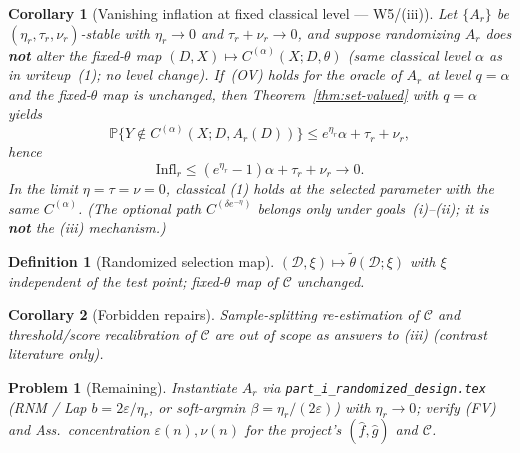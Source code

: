 \documentclass[11pt]{article}
\newtheorem{definition}{Definition}
\newtheorem{corollary}{Corollary}
\newtheorem{problem}{Problem}
\begin{document}
\begin{corollary}[Vanishing inflation at fixed classical level --- W5/(iii)]
\label{cor:vanish}
Let $\{A_r\}$ be $(\eta_r,\tau_r,\nu_r)$-stable with
$\eta_r\to 0$ and $\tau_r+\nu_r\to 0$, and suppose randomizing $A_r$ does
\textbf{not} alter the fixed-$\theta$ map $(D,X)\mapsto C^{(\alpha)}(X;D,\theta)$
(same classical level $\alpha$ as in writeup~(1); \emph{no} level change).
If~(OV) holds for the oracle of $A_r$ at level $q=\alpha$ and the fixed-$\theta$ map
is unchanged, then Theorem~\ref{thm:set-valued} with
$q=\alpha$ yields
\[
\mathbb{P}\bigl\{Y\notin C^{(\alpha)}(X;D,A_r(D))\bigr\}
\le e^{\eta_r}\alpha+\tau_r+\nu_r,
\]
hence
\[
\mathrm{Infl}_r
\le (e^{\eta_r}-1)\alpha+\tau_r+\nu_r
\to 0.
\]
In the limit $\eta=\tau=\nu=0$, classical (1) holds at the selected parameter
with the \emph{same} $C^{(\alpha)}$.
(The optional path $C^{(\delta e^{-\eta})}$ belongs only under goals~(i)--(ii);
it is \textbf{not} the (iii) mechanism.)
\end{corollary}

\begin{definition}[Randomized selection map]
$(\mathcal{D},\xi)\mapsto\tilde\theta(\mathcal{D};\xi)$ with $\xi$ independent of the
test point; fixed-$\theta$ map of $\mathcal{C}$ unchanged.
\end{definition}

\begin{corollary}[Forbidden repairs]
Sample-splitting re-estimation of $\mathcal{C}$ and threshold/score recalibration of
$\mathcal{C}$ are out of scope as answers to (iii) (contrast literature only).
\end{corollary}

\begin{problem}[Remaining]
Instantiate $A_r$ via \texttt{part\_i\_randomized\_design.tex}
(RNM / Lap $b=2\varepsilon/\eta_r$, or soft-argmin $\beta=\eta_r/(2\varepsilon)$)
with $\eta_r\to 0$; verify (FV) and Ass.\ concentration $\varepsilon(n),\nu(n)$ for the
project's $(\hat f,\hat g)$ and $\mathcal{C}$.
\end{problem}
\end{document}
